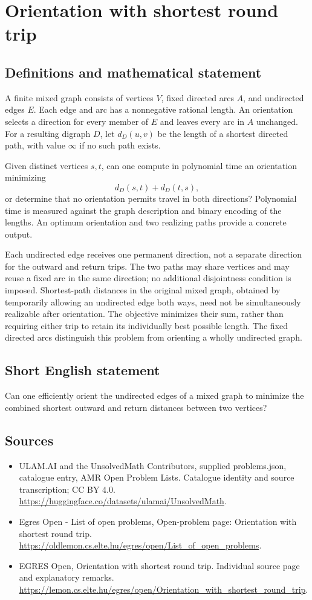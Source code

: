 \documentclass[11pt,a4paper]{article}
\begin{document}
\section*{Orientation with shortest round trip}\label{statement}

\subsection{Definitions and mathematical statement}
A finite mixed graph consists of vertices $V$, fixed directed arcs
$A$, and undirected edges $E$. Each edge and arc has a nonnegative
rational length. An orientation selects a direction for every member
of $E$ and leaves every arc in $A$ unchanged. For a resulting digraph
$D$, let $d_D(u,v)$ be the length of a shortest directed path, with
value $\infty$ if no such path exists.

Given distinct vertices $s,t$, can one compute in polynomial time
an orientation minimizing
\[
                                d_D(s,t)+d_D(t,s),
\]
or determine that no orientation permits travel in both directions?
Polynomial time is measured against the graph description and binary
encoding of the lengths. An optimum orientation and two realizing
paths provide a concrete output.

Each undirected edge receives one permanent direction, not a separate
direction for the outward and return trips. The two paths may share
vertices and may reuse a fixed arc in the same direction; no additional
disjointness condition is imposed. Shortest-path distances in the
original mixed graph, obtained by temporarily allowing an undirected
edge both ways, need not be simultaneously realizable after orientation.
The objective minimizes their sum, rather than requiring either trip
to retain its individually best possible length. The fixed directed
arcs distinguish this problem from orienting a wholly undirected graph.
\subsection{Short English statement}
Can one efficiently orient the undirected edges of a mixed graph
to minimize the combined shortest outward and return distances between two vertices?
\subsection{Sources}
\begin{itemize}
\item[S1] ULAM.AI and the UnsolvedMath Contributors, supplied problems.json, catalogue entry, AMR Open Problem Lists. Catalogue identity and source transcription; CC BY 4.0.
\url{https://huggingface.co/datasets/ulamai/UnsolvedMath}.
\item[S2] Egres Open - List of open problems, Open-problem page: Orientation with shortest round trip. 
\url{https://oldlemon.cs.elte.hu/egres/open/List_of_open_problems}.
\item[S3] EGRES Open, Orientation with shortest round trip. Individual source page and explanatory remarks.
\url{https://lemon.cs.elte.hu/egres/open/Orientation_with_shortest_round_trip}.
\end{itemize}
\end{document}

